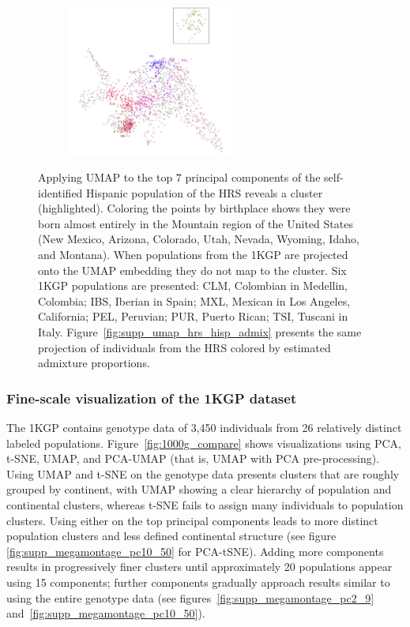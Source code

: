 \documentclass[12pt]{pnas-new}
\begin{document}
\begin{figure}
    \centering
    \begin{subfigure}{\textwidth}
    \includegraphics[width=0.6\textwidth]{images/HRS_1000G_NP1_UMAP_PC7_NC2_NN15_MD05_pca_hrshisp_added1kgp_2018115153245_1kgp_hisp.pdf}
    \end{subfigure}
    \caption{Applying UMAP to the top $7$ principal components of the self-identified Hispanic population of the HRS reveals a cluster (highlighted). Coloring the points by birthplace shows they were born almost entirely in the Mountain region of the United States (New Mexico, Arizona, Colorado, Utah, Nevada, Wyoming, Idaho, and Montana). When populations from the 1KGP are projected onto the UMAP embedding they do not map to the cluster. Six 1KGP populations are presented:
    CLM, Colombian in Medellin, Colombia;
    IBS, Iberian in Spain;
    MXL, Mexican in Los Angeles, California;
    PEL, Peruvian;
    PUR, Puerto Rican;
    TSI, Tuscani in Italy. Figure~\ref{fig:supp_umap_hrs_hisp_admix} presents the same projection of individuals from the HRS colored by estimated admixture proportions.}
    \label{fig:supp_umap_hrs_hisp_1kgp_hisp}
\end{figure}

\subsubsection*{Fine-scale visualization of the 1KGP dataset} The 1KGP contains genotype data of 3,450 individuals from 26 relatively distinct labeled populations\cite{10002015global}. Figure~\ref{fig:1000g_compare} shows visualizations using PCA, t-SNE, UMAP, and PCA-UMAP (that is, UMAP with PCA pre-processing). Using UMAP and t-SNE on the genotype data presents clusters that are roughly grouped by continent, with UMAP showing a clear hierarchy of population and continental clusters, whereas t-SNE fails to assign many individuals to population clusters. Using either on the top principal components leads to more distinct population clusters and less defined continental structure (see figure \ref{fig:supp_megamontage_pc10_50} for PCA-tSNE). Adding more components results in progressively finer clusters until approximately 20 populations appear using 15 components; further components gradually approach results similar to using the entire genotype data (see figures~\ref{fig:supp_megamontage_pc2_9} and~\ref{fig:supp_megamontage_pc10_50}). 
\end{document}

